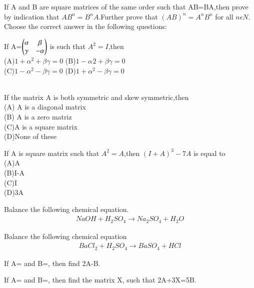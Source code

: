   \item If A and B are square matrices of the same order such that AB=BA,then prove by indication that $AB^{n}=B^{n}A$.Further prove that $(AB)^{n}=A^{n}B^{n}$ for all $n \epsilon N$.\\
  Choose the correct answer in the following questions:\\
  \item If A=$\begin{pmatrix}\alpha &\beta\\ \gamma &-\alpha\end{pmatrix}$ is such that $A^{2}=I$,then\\
  (A)$1+\alpha^{2}+\beta\gamma=0$ (B)$1-\alpha^{}2+\beta\gamma=0$\\
  (C)$1-\alpha^{2}-\beta\gamma=0$ (D)$1+\alpha^{2}-\beta\gamma=0$\\
\\
\solution

  \item If the matrix A is both symmetric and skew symmetric,then\\
  (A) A is a diagonal matrix \\
  (B) A is a zero matriz\\
  (C)A is a square matrix \\
  (D)None of these\\
  \item If A is square matrix such that $A^{2}=A$,then $(I+A)^{3}-7A$ is equal to\\
  (A)A \\(B)I-A\\ (C)I\\ (D)3A
\\
\solution

\item Balance the following chemical equation.
\begin{align}
NaOH + H_2SO_4 \xrightarrow{} Na_2SO_4  +  H_2O
\end{align}
\item Balance the following chemical equation
\begin{align}\label{1}
    BaCl_2 + H_2SO_4 \xrightarrow{} BaSO_4 + HCl
\end{align}
    \item If A= and B=, then find 2A-B.\\
    \item If A= and B=, then find the matrix X, such that 2A+3X=5B.\\

